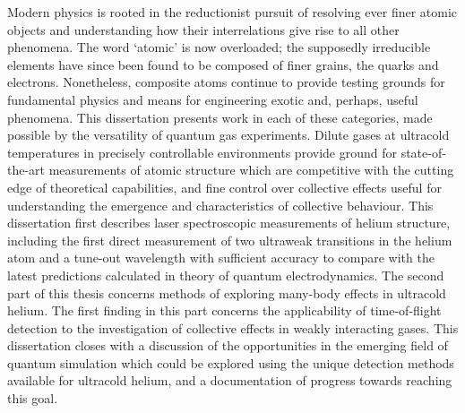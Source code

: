 Modern physics is rooted in the reductionist pursuit of resolving ever finer atomic objects and understanding how their interrelations give rise to all other phenomena. The word `atomic' is now overloaded; the supposedly irreducible elements have since been found to be composed of finer grains, the quarks and electrons. Nonetheless, composite atoms continue to provide testing grounds for fundamental physics and means for engineering exotic and, perhaps, useful phenomena. This dissertation presents work in each of these categories, made possible by the versatility of quantum gas experiments. Dilute gases at ultracold temperatures in precisely controllable environments provide ground for state-of-the-art measurements of atomic structure which are competitive with the cutting edge of theoretical capabilities, and fine control over collective effects useful for understanding the emergence and characteristics of collective behaviour. This dissertation first describes laser spectroscopic measurements of helium structure, including the first direct measurement of two ultraweak transitions in the helium atom and a tune-out wavelength with sufficient accuracy to compare with the latest predictions calculated in theory of quantum electrodynamics. The second part of this thesis concerns methods of exploring many-body effects in ultracold helium. The first finding in this part concerns the applicability of time-of-flight detection to the investigation of collective effects in weakly interacting gases. This dissertation closes with a discussion of the opportunities in the emerging field of quantum simulation which could be explored using the unique detection methods available for ultracold helium, and a documentation of progress towards reaching this goal.